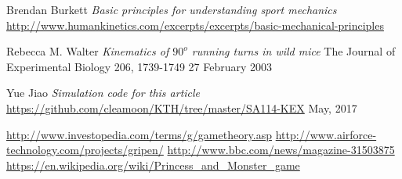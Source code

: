 \documentclass[ebook,11pt] {kth-mag}
\begin{document}
\begin{thebibliography}{9}
	Brendan Burkett
    \emph{Basic principles for understanding sport mechanics}
    \url{http://www.humankinetics.com/excerpts/excerpts/basic-mechanical-principles}
    
	Rebecca M. Walter
    \emph{Kinematics of $90^o$ running turns in wild mice}
    The Journal of Experimental Biology 206, 1739-1749
    27 February 2003 
    
	Yue Jiao
    \emph{Simulation code for this article}
    \url{https://github.com/cleamoon/KTH/tree/master/SA114-KEX}
    May, 2017

	\url{http://www.investopedia.com/terms/g/gametheory.asp}
	\url{http://www.airforce-technology.com/projects/gripen/}
	\url{http://www.bbc.com/news/magazine-31503875}
	\url{https://en.wikipedia.org/wiki/Princess_and_Monster_game}



    
    
\end{thebibliography}
\end{document}
